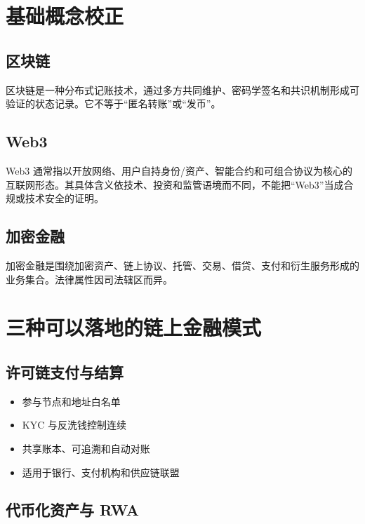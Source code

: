 \section{基础概念校正}\label{ux57faux7840ux6982ux5ff5ux6821ux6b63}

\subsection{区块链}\label{ux533aux5757ux94fe}

区块链是一种分布式记账技术，通过多方共同维护、密码学签名和共识机制形成可验证的状态记录。它不等于``匿名转账''或``发币''。

\subsection{Web3}\label{web3}

Web3
通常指以开放网络、用户自持身份/资产、智能合约和可组合协议为核心的互联网形态。其具体含义依技术、投资和监管语境而不同，不能把``Web3''当成合规或技术安全的证明。

\subsection{加密金融}\label{ux52a0ux5bc6ux91d1ux878d}

加密金融是围绕加密资产、链上协议、托管、交易、借贷、支付和衍生服务形成的业务集合。法律属性因司法辖区而异。

\section{三种可以落地的链上金融模式}\label{ux4e09ux79cdux53efux4ee5ux843dux5730ux7684ux94feux4e0aux91d1ux878dux6a21ux5f0f}

\subsection{许可链支付与结算}\label{ux8bb8ux53efux94feux652fux4ed8ux4e0eux7ed3ux7b97}

\begin{itemize}
\tightlist
\item
  参与节点和地址白名单
\item
  KYC 与反洗钱控制连续
\item
  共享账本、可追溯和自动对账
\item
  适用于银行、支付机构和供应链联盟
\end{itemize}

\subsection{代币化资产与 RWA}\label{ux4ee3ux5e01ux5316ux8d44ux4ea7ux4e0e-rwa}

